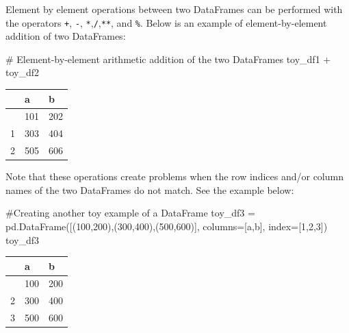 \documentclass[
  letterpaper,
  DIV=11,
  numbers=noendperiod]{scrreprt}
\newenvironment{Shaded}{\begin{snugshade}}{\end{snugshade}}
\newcommand{\CommentTok}[1]{\textcolor[rgb]{0.37,0.37,0.37}{#1}}
\newcommand{\DecValTok}[1]{\textcolor[rgb]{0.68,0.00,0.00}{#1}}
\newcommand{\NormalTok}[1]{\textcolor[rgb]{0.00,0.23,0.31}{#1}}
\newcommand{\OperatorTok}[1]{\textcolor[rgb]{0.37,0.37,0.37}{#1}}
\newcommand{\StringTok}[1]{\textcolor[rgb]{0.13,0.47,0.30}{#1}}
\begin{document}
Element by element operations between two DataFrames can be performed
with the operators \texttt{+}, \texttt{-},
\texttt{*},\texttt{/},\texttt{**}, and \texttt{\%}. Below is an example
of element-by-element addition of two DataFrames:

\begin{Shaded}
\begin{Highlighting}[]
\CommentTok{\# Element{-}by{-}element arithmetic addition of the two DataFrames}
\NormalTok{toy\_df1 }\OperatorTok{+}\NormalTok{ toy\_df2}
\end{Highlighting}
\end{Shaded}

\begin{longtable}[]{@{}lll@{}}
\toprule\noalign{}
& a & b \\
\midrule\noalign{}
\endhead
\bottomrule\noalign{}
\endlastfoot
0 & 101 & 202 \\
1 & 303 & 404 \\
2 & 505 & 606 \\
\end{longtable}

Note that these operations create problems when the row indices and/or
column names of the two DataFrames do not match. See the example below:

\begin{Shaded}
\begin{Highlighting}[]
\CommentTok{\#Creating another toy example of a DataFrame}
\NormalTok{toy\_df3 }\OperatorTok{=}\NormalTok{ pd.DataFrame([(}\DecValTok{100}\NormalTok{,}\DecValTok{200}\NormalTok{),(}\DecValTok{300}\NormalTok{,}\DecValTok{400}\NormalTok{),(}\DecValTok{500}\NormalTok{,}\DecValTok{600}\NormalTok{)], columns}\OperatorTok{=}\NormalTok{[}\StringTok{\textquotesingle{}a\textquotesingle{}}\NormalTok{,}\StringTok{\textquotesingle{}b\textquotesingle{}}\NormalTok{], index}\OperatorTok{=}\NormalTok{[}\DecValTok{1}\NormalTok{,}\DecValTok{2}\NormalTok{,}\DecValTok{3}\NormalTok{])}
\NormalTok{toy\_df3}
\end{Highlighting}
\end{Shaded}

\begin{longtable}[]{@{}lll@{}}
\toprule\noalign{}
& a & b \\
\midrule\noalign{}
\endhead
\bottomrule\noalign{}
\endlastfoot
1 & 100 & 200 \\
2 & 300 & 400 \\
3 & 500 & 600 \\
\end{longtable}
\end{document}
